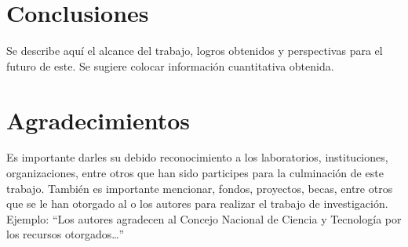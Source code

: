     \section{Conclusiones}
    
    Se describe aquí el alcance del trabajo, logros obtenidos y perspectivas para el futuro de este. Se sugiere colocar información cuantitativa obtenida.
    
    \section{Agradecimientos}
    
    Es importante darles su debido reconocimiento a los laboratorios, instituciones, organizaciones, entre otros que han sido participes para la culminación de este trabajo. También es importante mencionar, fondos, proyectos, becas, entre otros que se le han otorgado al o los autores para realizar el trabajo de investigación. Ejemplo: “Los autores agradecen al Concejo Nacional de Ciencia y Tecnología por los recursos otorgados…”
    
    
    

    
    
    
    

